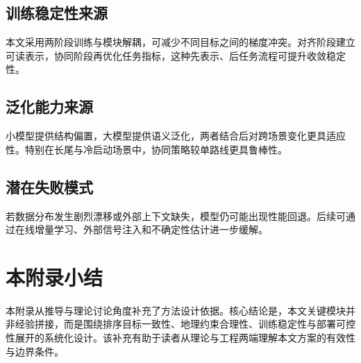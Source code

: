 \subsection{训练稳定性来源}
本文采用两阶段训练与模块解耦，可减少不同目标之间的梯度冲突。对齐阶段建立可读表示，协同阶段再优化任务指标，这种先表示、后任务流程可提升收敛稳定性。

\subsection{泛化能力来源}
小模型提供结构偏置，大模型提供语义泛化，两者结合后对跨场景变化更具适应性。特别在长尾与冷启动场景中，协同策略较单路线更具鲁棒性。

\subsection{潜在失败模式}
若数据分布发生剧烈漂移或外部上下文缺失，模型仍可能出现性能回退。后续可通过在线增量学习、外部信号注入和不确定性估计进一步缓解。

\section{本附录小结}
本附录从推导与理论讨论角度补充了方法设计依据。核心结论是，本文关键模块并非经验拼接，而是围绕排序目标一致性、地理约束合理性、训练稳定性与部署可控性展开的系统化设计。该补充有助于读者从理论与工程两端理解本文方案的有效性与边界条件。
